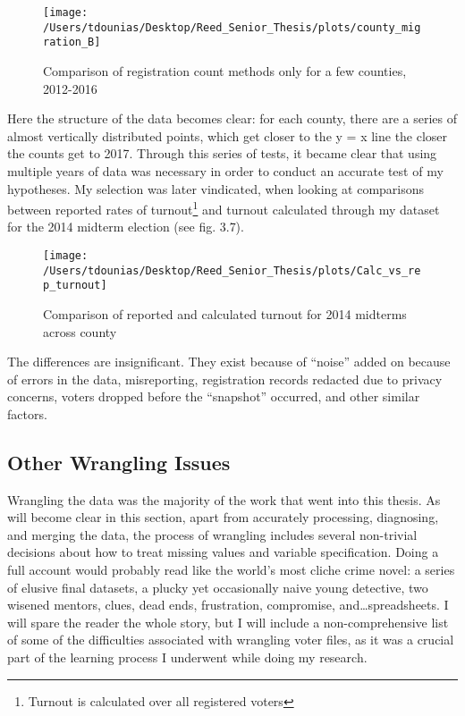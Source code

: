 \documentclass[12pt,twoside]{reedthesis}
\begin{document}
  \begin{figure}
  
  {\centering \texttt{[image: /Users/tdounias/Desktop/Reed\_Senior\_Thesis/plots/county\_migration\_B]} 
  
  }
  
  \caption[Comparison of registration count methods only for a few counties, 2012-2016]{Comparison of registration count methods only for a few counties, 2012-2016}\label{fig:county migration B}
  \end{figure}
  
  Here the structure of the data becomes clear: for each county, there are
  a series of almost vertically distributed points, which get closer to
  the y = x line the closer the counts get to 2017. Through this series of
  tests, it became clear that using multiple years of data was necessary
  in order to conduct an accurate test of my hypotheses. My selection was
  later vindicated, when looking at comparisons between reported rates of
  turnout\footnote{Turnout is calculated over all registered voters} and
  turnout calculated through my dataset for the 2014 midterm election (see
  fig. 3.7).
  
  \begin{figure}
  
  {\centering \texttt{[image: /Users/tdounias/Desktop/Reed\_Senior\_Thesis/plots/Calc\_vs\_rep\_turnout]} 
  
  }
  
  \caption[Comparison of reported and calculated turnout for 2014 midterms across county]{Comparison of reported and calculated turnout for 2014 midterms across county}\label{fig:comp turnout 2014}
  \end{figure}
  
  The differences are insignificant. They exist because of ``noise'' added
  on because of errors in the data, misreporting, registration records
  redacted due to privacy concerns, voters dropped before the ``snapshot''
  occurred, and other similar factors.
  
  \subsection{Other Wrangling Issues}\label{other-wrangling-issues}
  
  Wrangling the data was the majority of the work that went into this
  thesis. As will become clear in this section, apart from accurately
  processing, diagnosing, and merging the data, the process of wrangling
  includes several non-trivial decisions about how to treat missing values
  and variable specification. Doing a full account would probably read
  like the world's most cliche crime novel: a series of elusive final
  datasets, a plucky yet occasionally naive young detective, two wisened
  mentors, clues, dead ends, frustration, compromise,
  and\ldots{}spreadsheets. I will spare the reader the whole story, but I
  will include a non-comprehensive list of some of the difficulties
  associated with wrangling voter files, as it was a crucial part of the
  learning process I underwent while doing my research.
  
\end{document}
